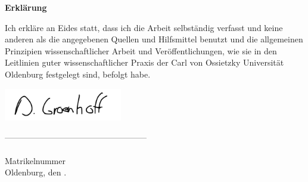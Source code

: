 \newpage
\thispagestyle{empty}
\vspace{6.8cm}
\begin{center}
	\begin{Large}
		\textbf{Erklärung}
	\end{Large}
\end{center}

\noindent
Ich erkläre an Eides statt, dass ich die Arbeit selbständig verfasst
und keine anderen als die angegebenen Quellen und Hilfsmittel benutzt und die allgemeinen Prinzipien wissenschaftlicher Arbeit und Veröffentlichungen, wie sie in den Leitlinien guter wissenschaftlicher Praxis der Carl von Ossietzky Universität Oldenburg festgelegt sind, befolgt habe.\\
\vspace{3cm}
\begin{flushleft}
	\includegraphics[height=40pt]{Abbildungen/signature.pdf} \\
\end{flushleft}
\vspace*{-0.8cm}
--------------------------------------------------- \\
\Name\\
Matrikelnummer \MatrNr\\
Oldenburg, den \the\day. \MONTH\ \the\year{}
